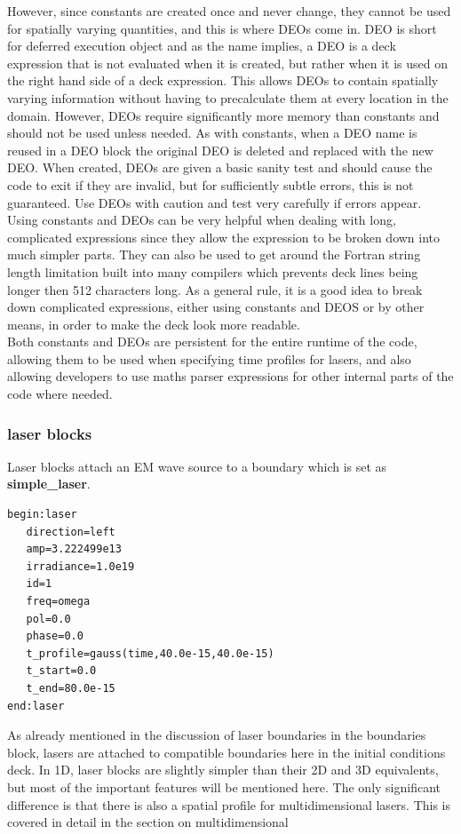 \documentclass[12pt,a4paper]{article}
\newcommand{\boxverbatim}[1]{\begin{Verbatim}[obeytabs=true,frame=single,
  framerule=0.5mm,rulecolor=\color{warwickmid},formatcom=\color{black},label=#1]}
\newcommand{\inlineemph}[1]{{\color{warwicklight} \bf{#1}}}
\newcommand{\EPOCH}{{\color{warwickdark}\fontfamily{phv}\selectfont{EPOCH}}}
\begin{document}
However, since constants are created once and never change, they cannot be used
for spatially varying quantities, and this is where DEOs come in. DEO is short
for deferred execution object and as the name implies, a DEO is a deck
expression that is not evaluated when it is created, but rather when it is used
on the right hand side of a deck expression. This allows DEOs to contain
spatially varying information without having to precalculate them at every
location in the domain. However, DEOs require significantly more memory than
constants and should not be used unless needed. As with constants, when a DEO
name is reused in a DEO block the original DEO is deleted and replaced with the
new DEO. When created, DEOs are given a basic sanity test and should cause the
code to exit if they are invalid, but for sufficiently subtle errors, this is
not guaranteed. Use DEOs with caution and test very carefully if errors
appear.\\

Using constants and DEOs can be very helpful when dealing with long,
complicated expressions since they allow the expression to be broken down into
much simpler parts. They can also be used to get around the Fortran string
length limitation built into many compilers which prevents deck lines being
longer then 512 characters long. As a general rule, it is a good idea to break
down complicated expressions, either using constants and DEOS or by other
means, in order to make the deck look more readable.\\

Both constants and DEOs are persistent for the entire runtime of the code,
allowing them to be used when specifying time profiles for lasers, and also
allowing developers to use maths parser expressions for other internal parts of
the code where needed.

\subsubsection{\inlineemph{laser} blocks}
Laser blocks attach an EM wave source to a boundary which is set as
\inlineemph{simple\_laser}.

\boxverbatim{laser block}
begin:laser
   direction=left
   amp=3.222499e13
   irradiance=1.0e19
   id=1
   freq=omega
   pol=0.0
   phase=0.0
   t_profile=gauss(time,40.0e-15,40.0e-15)
   t_start=0.0
   t_end=80.0e-15
end:laser
\end{Verbatim}

As already mentioned in the discussion of laser boundaries in the boundaries
block, lasers are attached to compatible boundaries here in the initial
conditions deck. In 1D, laser blocks are slightly simpler than their 2D and 3D
equivalents, but most of the important features will be mentioned here. The
only significant difference is that there is also a spatial profile for
multidimensional lasers. This is covered in detail in the section on
multidimensional {\EPOCH}\\
\end{document}
